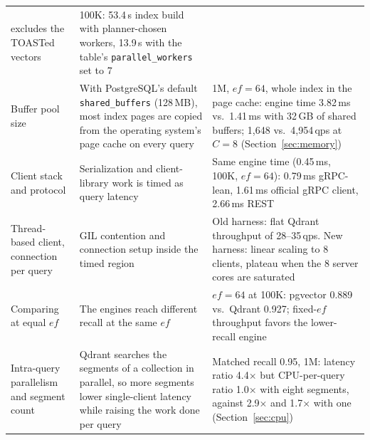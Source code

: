 \documentclass[preprint,12pt]{elsarticle}
\begin{document}
\begin{table}[t]
\begin{tabular}{p{}p{}p{}}
      excludes the TOASTed vectors &
      100K: 53.4\,s index build with planner-chosen workers, 13.9\,s with the table's
      \texttt{parallel\_workers} set to 7 \\
    Buffer pool size &
      With PostgreSQL's default \texttt{shared\_buffers} (128\,MB), most index pages are
      copied from the operating system's page cache on every query &
      1M, $ef=64$, whole index in the page cache: engine time 3.82\,ms vs.\ 1.41\,ms with
      32\,GB of shared buffers; 1{,}648 vs.\ 4{,}954\,qps at $C=8$
      (Section~\ref{sec:memory}) \\
    Client stack and protocol &
      Serialization and client-library work is timed as query latency &
      Same engine time (0.45\,ms, 100K, $ef=64$): 0.79\,ms gRPC-lean, 1.61\,ms official
      gRPC client, 2.66\,ms REST \\
    Thread-based client, connection per query &
      GIL contention and connection setup inside the timed region &
      Old harness: flat Qdrant throughput of 28--35\,qps. New harness: linear scaling to
      8 clients, plateau when the 8 server cores are saturated \\
    Comparing at equal $ef$ &
      The engines reach different recall at the same $ef$ &
      $ef=64$ at 100K: pgvector 0.889 vs.\ Qdrant 0.927; fixed-$ef$ throughput favors the
      lower-recall engine \\
    Intra-query parallelism and segment count &
      Qdrant searches the segments of a collection in parallel, so more segments lower
      single-client latency while raising the work done per query &
      Matched recall 0.95, 1M: latency ratio 4.4$\times$ but CPU-per-query ratio
      1.0$\times$ with eight segments, against 2.9$\times$ and 1.7$\times$ with one
      (Section~\ref{sec:cpu}) \\
    \bottomrule
  \end{tabular}
\end{table}
\end{document}
